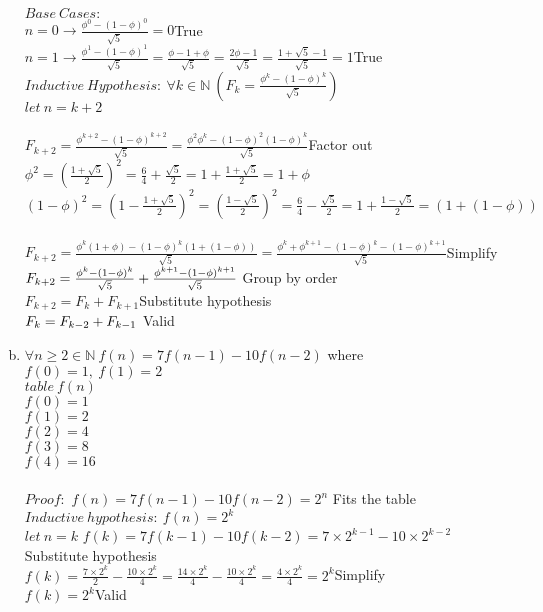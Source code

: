 \documentclass[11pt,letterpaper]{article}
\begin{document}
\begin{enumerate}[(a)]
\\
$Base~Cases:$\\
$n=0\rightarrow \frac{\phi^0-(1-\phi)^0}{\sqrt{5}} = 0$\hfill True\\
$n=1\rightarrow \frac{\phi^1-(1-\phi)^1}{\sqrt{5}} = \frac{\phi- 1+\phi}{\sqrt{5}}=\frac{2\phi -1}{\sqrt{5}}=\frac{1+\sqrt{5}-1}{\sqrt{5}}=1$\hfill True\\
$Inductive~Hypothesis:~\forall k\in\mathbb{N}~(F_k = \frac{\phi^k-(1-\phi)^k}{\sqrt{5}})$\\
$let~n=k+2$\\
\\
$F_{k+2} = \frac{\phi^{k+2}-(1-\phi)^{k+2}}{\sqrt{5}}
= \frac{\phi^2\phi^{k}-(1-\phi)^{2}(1-\phi)^{k}}{\sqrt{5}}$\hfill Factor out\\
$\phi^2 = (\frac{1+\sqrt{5}}{2})^2=\frac{6}{4}+\frac{\sqrt{5}}{2}=1 +\frac{1+\sqrt{5}}{2}
= 1+\phi$\\
$(1-\phi)^2=(1-\frac{1+\sqrt{5}}{2})^2=(\frac{1-\sqrt{5}}{2})^2=\frac{6}{4}-\frac{\sqrt{5}}{2}=1+\frac{1-\sqrt{5}}{2}=(1+(1-\phi))$\\
\\
$F_{k+2} = \frac{\phi^{k}(1+\phi)-(1-\phi)^{k}(1+(1-\phi))}{\sqrt{5}}
= \frac{\phi^{k}+\phi^{k+1}-(1-\phi)^{k}-(1-\phi)^{k+1}}{\sqrt{5}}$\hfill Simplify\\
$F_{k+2} =\frac{\phi^{k}-(1-\phi)^{k}}{\sqrt{5}} + 
\frac{\phi^{k+1}-(1-\phi)^{k+1}}{\sqrt{5}}\hfill$ Group by order\\
$F_{k+2} = F_{k} +F_{k+1}$\hfill Substitute hypothesis\\
$F_k = F_{k-2}+F_{k-1}\hfill$ Valid
\item
$\forall n\geq2\in\mathbb{N}~f(n)=7f(n-1)-10f(n-2)$ where $f(0) = 1,~ f(1) = 2$\\
$table~f(n)$\\
$f(0) = 1$\\
$f(1) =2$\\
$f(2)=4$\\
$f(3)=8$\\
$f(4)=16$\\
\\
$Proof:$
$f(n)=7f(n-1)-10f(n-2)=2^n$ \hfill Fits the table\\
$Inductive~hypothesis:~f(n)=2^k$\\
$let~n=k$
$f(k)=7f(k-1)-10f(k-2)=7\times2^{k-1}-10\times2^{k-2}$\hfill Substitute hypothesis\\
$f(k)=\frac{7\times2^{k}}{2}-\frac{10\times2^{k}}{4}
=\frac{14\times2^{k}}{4}-\frac{10\times2^{k}}{4}
=\frac{4\times2^{k}}{4}= 2^k$\hfill Simplify\\
$f(k) = 2^k$\hfill Valid\\

\end{enumerate}
\end{document}
